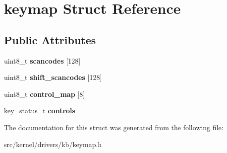 \hypertarget{structkeymap}{}\section{keymap Struct Reference}
\label{structkeymap}
\subsection*{Public Attributes}
\begin{DoxyCompactItemize}
\item 
\mbox{\label{structkeymap_aab4a29e12c911e360484cb1459619f57}} 
uint8\+\_\+t {\bfseries scancodes} \mbox{[}128\mbox{]}
\item 
\mbox{\label{structkeymap_aaef035b4922074ca0eb2cb17267eb8ac}} 
uint8\+\_\+t {\bfseries shift\+\_\+scancodes} \mbox{[}128\mbox{]}
\item 
\mbox{\label{structkeymap_a4641ff9ca479bba091ae6e383b690195}} 
uint8\+\_\+t {\bfseries control\+\_\+map} \mbox{[}8\mbox{]}
\item 
\mbox{\label{structkeymap_a98eb06132e52e818979a04236ff63b63}} 
key\+\_\+status\+\_\+t {\bfseries controls}
\end{DoxyCompactItemize}


The documentation for this struct was generated from the following file\+:\begin{DoxyCompactItemize}
\item 
src/kernel/drivers/kb/keymap.\+h\end{DoxyCompactItemize}
